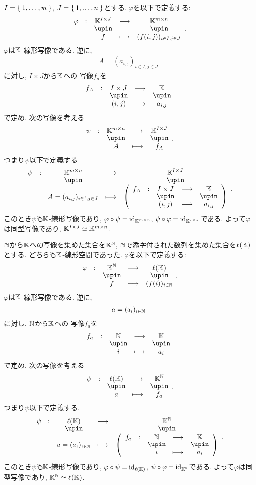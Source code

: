 \begin{example}
  $I=\Set{1,\dots,m}$, $J=\Set{1,\ldots,n}$とする.
  $\varphi$を以下で定義する:
  \begin{align*}
    \shazo{\varphi}{\KK^{I\times J}}{\KK^{m\times n}}{f}{(f(i,j))_{i\in I,j\in J}}.
  \end{align*}
  $\varphi$は$\mathbb{K}$-線形写像である.
  逆に,
  \begin{align*}
    A=
      (a_{i,j})_{i\in I,j\in J}
  \end{align*}
  に対し,
  $I\times J$から$\mathbb{K}$への
  写像$f_a$を
  \begin{align*}
    \shazo{f_A}{I\times J}{\KK}{(i,j)}{a_{i,j}}
  \end{align*}
  で定め,
  次の写像を考える:
  \begin{align*}
    \shazo{\psi}{\KK^{m\times n}}{\KK^{I\times J}}{A}{f_A}.
  \end{align*}
  つまり$\psi$以下で定義する.
  \begin{align*}
    \shazo{\psi}{\KK^{m\times n}}{\KK^{I\times J}}
          {A=(a_{i,j})_{i\in I,j\in J}}{\left(\shazo{f_A}{I\times J}{\KK}{(i,j)}{a_{i,j}}\right)}.
  \end{align*}
  このとき$\psi$も$\mathbb{K}$-線形写像であり,
  $\varphi\circ\psi=\operatorname{id}_{\mathbb{K}^{m\times n}}$,
  $\psi\circ\varphi=\operatorname{id}_{\mathbb{K}^{I\times J}}$である.
  よって$\varphi$は同型写像であり,
  $\mathbb{K}^{I\times J}\simeq \mathbb{K}^{m\times n}$.
\end{example}

\begin{example}
  $\mathbb{N}$から$\mathbb{K}$への写像を集めた集合を$\mathbb{K}^{\mathbb{N}}$,
  $\mathbb{N}$で添字付された数列を集めた集合を$\ell(\mathbb{K})$とする.
  どちらも$\mathbb{K}$-線形空間であった.
  $\varphi$を以下で定義する:
  \begin{align*}
    \shazo{\varphi}{\KK^\NN}{\ell(\KK)}{f}{(f(i))_{i\in \NN}}.
  \end{align*}
  $\varphi$は$\mathbb{K}$-線形写像である.
  逆に,
  \begin{align*}
    a=
      (a_{i})_{i\in \mathbb{N}}
  \end{align*}
  に対し,
  $\mathbb{N}$から$\mathbb{K}$への
  写像$f_a$を
  \begin{align*}
    \shazo{f_a}{\NN}{\KK}{i}{a_{i}}
  \end{align*}
  で定め,
  次の写像を考える:
  \begin{align*}
    \shazo{\psi}{\ell(\KK)}{\KK^\NN}{a}{f_a}.
  \end{align*}
  つまり$\psi$以下で定義する.
  \begin{align*}
    \shazo{\psi}{\ell(\KK)}{\KK^\NN}{a=(a_{i})_{i\in \NN}}{\left(\shazo{f_a}{\NN}{\KK}{i}{a_{i}}\right)}.
  \end{align*}
  このとき$\psi$も$\mathbb{K}$-線形写像であり,
  $\varphi\circ\psi=\operatorname{id}_{\ell(\mathbb{K})}$,
  $\psi\circ\varphi=\operatorname{id}_{\mathbb{K}^{\mathbb{N}}}$である.
  よって$\varphi$は同型写像であり,
  $\mathbb{K}^{\mathbb{N}}\simeq \ell(\mathbb{K})$.
\end{example}

